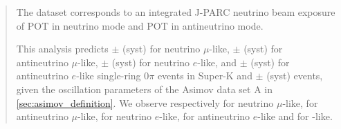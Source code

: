 \begin{frontmatter}
\begin{abstract}
The \RunPeriod dataset corresponds to an integrated J-PARC neutrino beam exposure of \TotalPotNuRunOneEight{} POT in neutrino mode and \TotalPotNuBarRunOneEight{} POT in antineutrino mode.

This analysis predicts \NskOscExpectationNumuRunOneEight{} $\pm$ \NskOscExpectationNumuErrorRunOneEight{} (syst) for neutrino $\mu$-like, \NskOscExpectationNumuBarRunOneEight{} $\pm$ \NskOscExpectationNumuBarErrorRunOneEight{} (syst) for antineutrino $\mu$-like, \NskOscExpectationNueRunOneEight{} $\pm$ \NskOscExpectationNueErrorRunOneEight{} (syst) for neutrino $e$-like, and \NskOscExpectationNueBarRunOneEight{} $\pm$ \NskOscExpectationNueBarErrorRunOneEight{} (syst) for antineutrino $e$-like single-ring \( 0 \pi \) events in Super-K and \NskOscExpectationNueCConepiRunOneEight{} $\pm$ \NskOscExpectationNueCConepiErrorRunOneEight{} (syst) \nueCConepi{} events, given the oscillation parameters of the Asimov data set A in \ref{sec:asimov_definition}. We observe respectively \NskObservedNumuRunOneEight{} for neutrino $\mu$-like, \NskObservedNumuBarRunOneEight{}  for antineutrino $\mu$-like,\NskObservedNueRunOneEight{}  for neutrino $e$-like, \NskObservedNueBarRunOneEight{}  for antineutrino $e$-like and \NskObservedNueCConepiRunOneEight{} for \nueCConepi{}-like.

\end{abstract}

\end{frontmatter}
